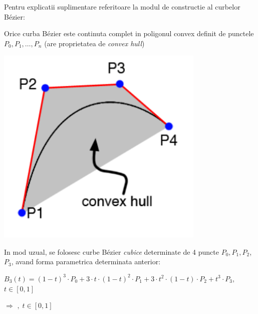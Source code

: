\documentclass{article}
\begin{document}
\begin{minipage}{0.75\textwidth}
    \tabto{0.5cm} Pentru explicatii suplimentare referitoare la modul de constructie al curbelor B\'ezier:\framebox[0.3cm][r]{\footnotemark}
    
    \tabto{0.5cm} Orice curba B\'ezier este continuta complet in poligonul convex definit de punctele $P_0, P_1, \dots, P_n$ (are proprietatea de \textit{convex hull})
\end{minipage}
\begin{minipage}{0.25\textwidth}
    \includegraphics[width=0.75\textwidth]{convex_hull}
\end{minipage}


In mod uzual, se folosesc curbe B\'ezier \textit{cubice} determinate de 4 puncte $P_0, P_1, P_2$, $P_3$, avand forma parametrica determinata anterior:

$B_3(t) = (1-t)^3 \cdot P_0 + 3\cdot t \cdot (1-t)^2 \cdot P_1 + 3 \cdot t^2 \cdot (1-t) \cdot P_2 + t^3 \cdot P_3$, $t \in [0, 1]$

$\Longrightarrow$
$,\;t \in [0, 1]$\\
\end{document}
